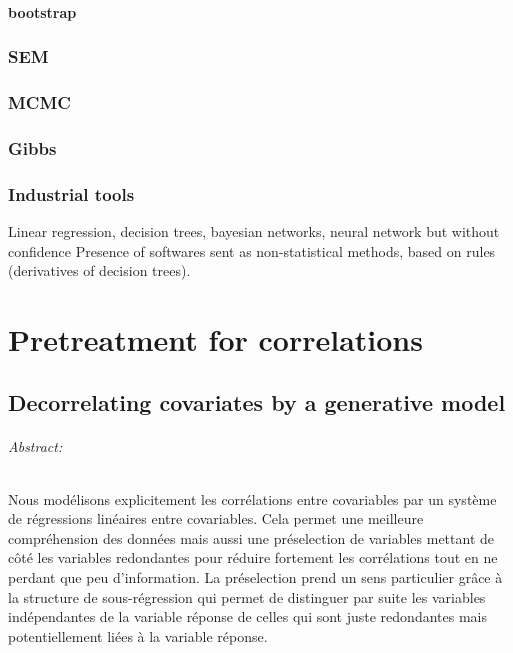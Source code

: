 \documentclass[12pt,a4paper]{report}
\begin{document}
			\subsection{bootstrap}
			\cite{efron1979bootstrap,efron1994introduction}
		\section{SEM}
		\section{MCMC}
		\cite{gilks1996markov,chib1995understanding,roberts2001optimal}
		\section{Gibbs}
		\cite{casella1992explaining}
		\section{Industrial tools}
			Linear regression, decision trees, bayesian networks, neural network but without confidence
			Presence of softwares sent as non-statistical methods, based on rules (derivatives of decision trees).			
			
\part{Pretreatment for correlations}
\chapter{Decorrelating covariates by a generative model}
\paragraph{Abstract:} Nous modélisons explicitement les corrélations entre covariables par un système de régressions linéaires entre covariables. Cela permet une meilleure compréhension des données mais aussi une préselection de variables mettant de côté les variables redondantes pour réduire fortement les corrélations tout en ne perdant que peu d'information. La préselection prend un sens particulier grâce à la structure de sous-régression qui permet de distinguer par suite les variables indépendantes de la variable réponse de celles qui sont juste redondantes mais potentiellement liées à la variable réponse.
\\

	
\end{document}
